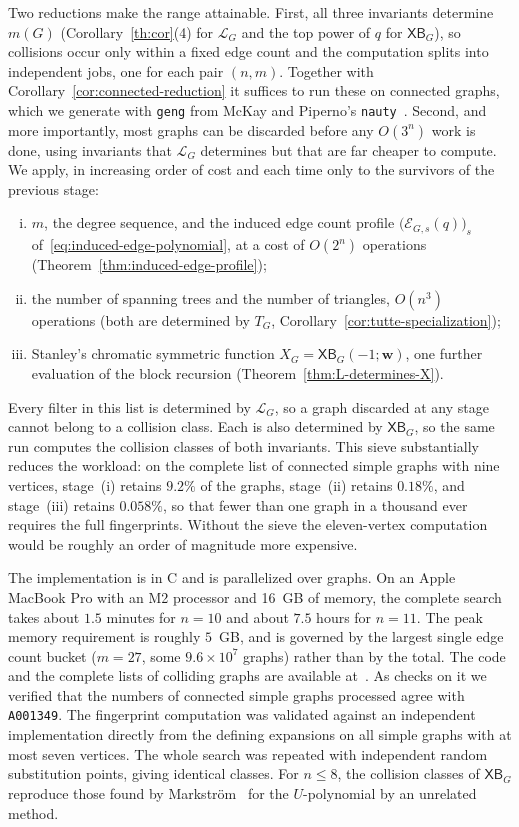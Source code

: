 \documentclass[11pt]{article}
\theoremstyle{plain}
\theoremstyle{definition}
\renewcommand{\mathcal}{\mathscr}
\newcommand{\LL}{\mathcal{L}}    %
\newcommand{\cE}{\mathcal{E}}    %
\newcommand{\bw}{\mathbf{w}}
\newcommand{\XB}{\mathsf{XB}} %
\numberwithin{equation}{section}
\begin{document}
Two reductions make the range attainable.  First, all three invariants
determine $m(G)$ (Corollary~\ref{th:cor}(4) for $\LL_G$ and the top power of $q$
for $\XB_G$), so collisions occur only within a fixed edge count and the
computation splits into independent jobs, one for each pair $(n,m)$.  Together
with Corollary~\ref{cor:connected-reduction} it suffices to run these on
connected graphs, which we generate with \texttt{geng} from
McKay and Piperno's \texttt{nauty}~\cite{nauty}.  Second, and more
importantly, most graphs can be discarded before any $O(3^{n})$ work is done,
using invariants that $\LL_G$ determines but that are far cheaper to compute.
We apply, in increasing order of cost and each time only to the survivors of the previous stage:
\begin{enumerate}[(i)]
\item $m$, the degree sequence, and the induced edge count profile
  $\bigl(\cE_{G,s}(q)\bigr)_{s}$ of~\eqref{eq:induced-edge-polynomial}, at a cost of $O(2^{n})$
  operations (Theorem~\ref{thm:induced-edge-profile});
\item the number of spanning trees and the number of triangles, $O(n^{3})$ operations (both are determined
  by $T_G$, Corollary~\ref{cor:tutte-specialization});
\item Stanley's chromatic symmetric function $X_G=\XB_G(-1;\bw)$, one further evaluation
  of the block recursion      (Theorem~\ref{thm:L-determines-X}).
\end{enumerate}
Every filter in this list is determined by $\LL_G$, so a graph discarded at any stage
cannot belong to a collision class.  Each is also determined by $\XB_G$,
so the same run computes the collision classes of both invariants.
This sieve substantially reduces the workload: on the complete list of connected
simple graphs with nine vertices, stage~(i) retains $9.2\%$ of the graphs,
stage~(ii) retains $0.18\%$, and stage~(iii) retains $0.058\%$,
so that fewer than one graph in a thousand ever requires the full fingerprints.
Without the sieve the eleven-vertex computation would be roughly an order of magnitude more expensive.

The implementation is in C and is parallelized over graphs.  On an Apple MacBook Pro with an M2 processor
and 16~GB of memory, the complete search takes about $1.5$ minutes for $n=10$
and about $7.5$ hours for $n=11$. The peak memory requirement is roughly $5$~GB,
and is governed by the largest single edge count bucket ($m=27$, some $9.6\times10^{7}$ graphs)
rather than by the total.
The code and the complete lists of colliding graphs are available at~\cite{code}.  As checks
on it we verified that the numbers of connected simple graphs processed agree with
\texttt{A001349}. The fingerprint computation was validated against an independent implementation directly
from the defining expansions on all simple graphs with at most seven vertices.
The whole search was repeated with independent random substitution points, giving identical classes.
For $n\le8$, the collision classes of $\XB_G$ reproduce those found by Markstr\"om~\cite{Mar}
for the $U$-polynomial by an unrelated method.
\end{document}
